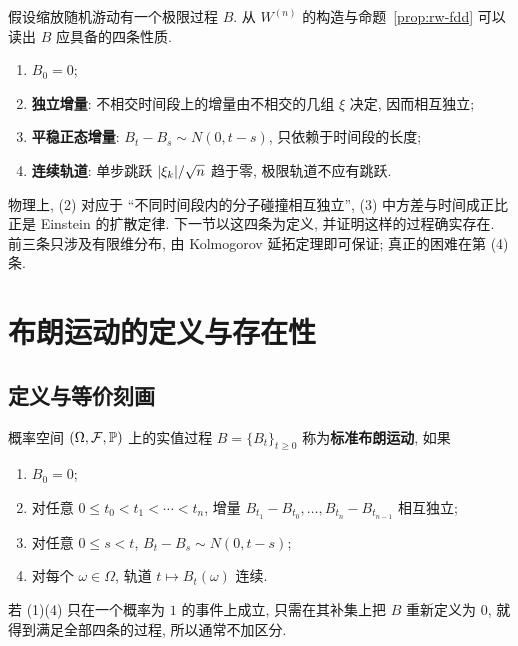 假设缩放随机游动有一个极限过程 $B$. 从 $W^{(n)}$ 的构造与命题~\ref{prop:rw-fdd} 可以读出 $B$ 应具备的四条性质.
\begin{enumerate}
\item $B_0=0$;
\item \textbf{独立增量}: 不相交时间段上的增量由不相交的几组 $\xi$ 决定, 因而相互独立;
\item \textbf{平稳正态增量}: $B_t-B_s\sim N(0,t-s)$, 只依赖于时间段的长度;
\item \textbf{连续轨道}: 单步跳跃 $\abs{\xi_k}/\sqrt{n}$ 趋于零, 极限轨道不应有跳跃.
\end{enumerate}
物理上, (2) 对应于 ``不同时间段内的分子碰撞相互独立'', (3) 中方差与时间成正比正是 Einstein 的扩散定律. 下一节以这四条为定义, 并证明这样的过程确实存在. 前三条只涉及有限维分布, 由 Kolmogorov 延拓定理即可保证; 真正的困难在第 (4) 条.

\section{布朗运动的定义与存在性}
\label{sec:4-2}

\subsection{定义与等价刻画}

\begin{definition}[标准布朗运动]\label{def:bm}
概率空间 $(\Omega,\mathcal{F},\P)$ 上的实值过程 $B=\{B_t\}_{t\ge0}$ 称为\textbf{标准布朗运动}, 如果
\begin{enumerate}
\item $B_0=0$;
\item 对任意 $0\le t_0<t_1<\cdots<t_n$, 增量 $B_{t_1}-B_{t_0},\dots,B_{t_n}-B_{t_{n-1}}$ 相互独立;
\item 对任意 $0\le s<t$, $B_t-B_s\sim N(0,t-s)$;
\item 对每个 $\omega\in\Omega$, 轨道 $t\mapsto B_t(\omega)$ 连续.
\end{enumerate}
若 (1)(4) 只在一个概率为 $1$ 的事件上成立, 只需在其补集上把 $B$ 重新定义为 $0$, 就得到满足全部四条的过程, 所以通常不加区分.
\end{definition}

